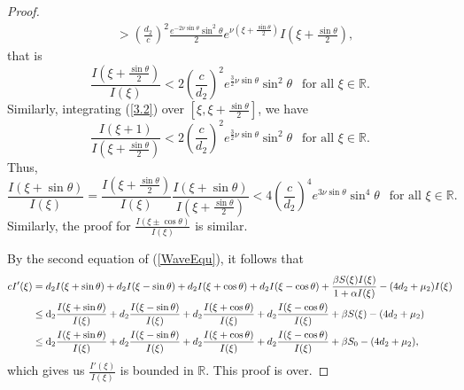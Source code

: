 \documentclass[final,3p,times]{elsarticle}
\numberwithin{equation}{section}
\def\d {{\rm d}}
\begin{document}
\begin{proof}
\begin{align*}
 &>\left(\frac{d_2}{c}\right)^2\frac{e^{-2\nu\sin\theta}\sin^{2}\theta }{2}e^{\nu(\xi + \frac{\sin\theta}{2})}I\left(\xi + \frac{\sin\theta}{2}\right),
\end{align*}
that is
\[
\frac{I\left(\xi + \frac{\sin\theta}{2}\right)}{I(\xi)}<2\left(\frac{c}{d_2}\right)^2e^{\frac{3}{2}\nu\sin\theta}\sin^{2}\theta ~~\text{ for all } \xi \in \mathbb{R}.
\]
Similarly, integrating (\ref{3.2}) over \(\left[\xi, \xi + \frac{\sin\theta}{2}\right]\), we have
\[
\frac{I(\xi + 1)}{I\left(\xi + \frac{\sin\theta}{2}\right)}<2\left(\frac{c}{d_2}\right)^2e^{\frac{3}{2}\nu\sin\theta}\sin^{2}\theta~~ \text{ for all } \xi \in \mathbb{R}.
\]
Thus,
\[
\frac{I(\xi + \sin\theta)}{I(\xi)}=\frac{I\left(\xi + \frac{\sin\theta}{2}\right)}{I(\xi)}\frac{I(\xi + \sin\theta)}{I\left(\xi + \frac{\sin\theta}{2}\right)}<4\left(\frac{c}{d_2}\right)^4e^{3\nu\sin\theta}\sin^{4}\theta~~ \text{ for all } \xi \in \mathbb{R}.
\]
Similarly, the proof for $\displaystyle\frac{I(\xi \pm \cos\theta)}{I(\xi)}$ is similar.

By the second equation of (\ref{WaveEqu}), it follows that
\begin{align*}
cI'(\xi)&=d_{2}I(\xi + \sin\theta)+d_{2}I(\xi - \sin\theta)+d_{2}I(\xi + \cos\theta)+d_{2}I(\xi - \cos\theta)+\frac{\beta S(\xi){I(\xi)}}{1+\alpha I(\xi)}-(4d_2+\mu_2)I(\xi)\\
&\leq\d_{2}\frac{I(\xi + \sin\theta)}{I(\xi)}+d_{2}\frac{I(\xi - \sin\theta)}{I(\xi)}+d_{2}\frac{I(\xi + \cos\theta)}{I(\xi)}+d_{2}\frac{I(\xi - \cos\theta)}{I(\xi)}+\beta S(\xi)-(4d_2+\mu_2)\\
&\leq\d_{2}\frac{I(\xi + \sin\theta)}{I(\xi)}+d_{2}\frac{I(\xi - \sin\theta)}{I(\xi)}+d_{2}\frac{I(\xi + \cos\theta)}{I(\xi)}+d_{2}\frac{I(\xi - \cos\theta)}{I(\xi)}+\beta S_{0}-(4d_2+\mu_2),
\end{align*}
which gives us \(\displaystyle\frac{I'(\xi)}{I(\xi)}\) is bounded in \(\mathbb{R}\). This proof is over.
\end{proof}
\end{document}
